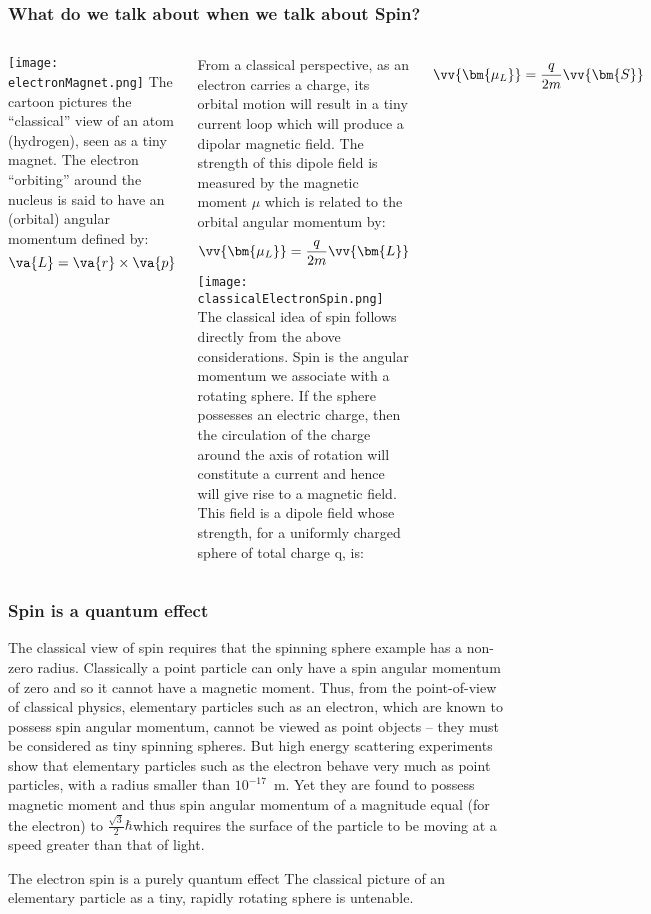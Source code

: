 
\begin{frame}
\frametitle{What do we talk about when we talk about Spin?}
\begin{columns}
 
\texttt{[image: electronMagnet.png]}
The cartoon pictures the ``classical'' view of an atom (hydrogen), seen as a tiny magnet. The electron ``orbiting'' around the nucleus is said to have an (orbital) angular momentum defined by:
\[
\va{L} = \va{r} \times \va{p}
\]

From a classical perspective, as an electron carries a charge, its orbital motion will result in a tiny current loop which will produce a dipolar magnetic field. The strength of this dipole field is measured by the magnetic moment $\mu$ which is related to the orbital angular momentum by:
\[
\vv{\bm{\mu_L}} = \frac{q}{2m}\vv{\bm{L}} 
\]
\texttt{[image: classicalElectronSpin.png]}
The classical idea of spin follows directly from the above considerations. Spin is the angular momentum we associate with a rotating sphere. If the sphere possesses an electric charge, then the circulation of the charge around the axis of rotation will constitute a current and hence will give rise to a magnetic field. This field is a dipole field whose strength, for a uniformly charged sphere of total charge q, is:

\[
\vv{\bm{\mu_L}} = \frac{q}{2m}\vv{\bm{S}} 
\]
\end{columns}
\end{frame}

\begin{frame}
\frametitle{Spin is a quantum effect}
 
The classical view of spin requires that the spinning sphere example has a non-zero radius. Classically a point particle can only have a spin angular momentum of zero and so it cannot have a magnetic moment. Thus, from the point-of-view of classical physics, elementary particles such as an electron, which are known to possess spin angular momentum, cannot be viewed as point objects -- they must be considered as tiny spinning spheres. But high energy scattering experiments show that \alert{elementary particles such as the electron behave very much as point particles}, with a radius smaller than $10^{-17}$~m. Yet they are found to possess magnetic moment and thus spin angular momentum of a magnitude equal (for the electron) to 
$\frac{\sqrt{3}}{2} \hbar$which requires the surface of the particle to be moving at a speed greater than that of light. 
 
\begin{alertblock}{The electron spin is a purely quantum effect}
The classical picture of an elementary particle as a tiny, rapidly rotating sphere is untenable.
\end{alertblock}
 \end{frame}
 
